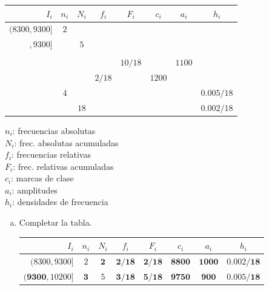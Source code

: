 \documentclass[]{article}
\begin{document}
\begin{enumerate}[{Ejercicio} 1.]
		\begin{minipage}[t]{.7\linewidth}
			\raggedleft
			\vspace*{0pt}
			\begin{center}
				\begin{tabular}{| r | c | c | c | c | c | c | c |}
					\hline
					$I_i$ & $n_i$ & $N_i$ & $f_i$ & $F_i$ & $c_i$ & $a_i$ & $h_i$ \\
					\hline
					$(8300, 9300]$ & $2$ &     & & & & & \\
					$ ,9300]$      &     & $5$ & & & & &  \\
							       &     &     & & & & &  \\
								   &     &     & & $10/18$ & & $1100$&  \\
								   &     &     & $2/18$ & & $1200$ & &  \\
								   & $4$ &     & & & & & $0.005/18$ \\
								   &     &$18$ & & & & &  $0.002/18$ \\
					\hline
				\end{tabular}
			\end{center}
		\end{minipage}%
		\begin{minipage}[t]{.5\linewidth}
			\vspace*{8pt}
			\raggedright
			$n_i$: frecuencias absolutas \\
			$N_i$: frec. absolutas acumuladas \\
			$f_i$: frecuencias relativas \\
			$F_i$: frec. relativas acumuladas \\
			$c_i$: marcas de clase \\
			$a_i$: amplitudes \\
			$h_i$: densidades de frecuencia
		\end{minipage}
		\begin{enumerate}[a)]
			\item Completar la tabla.
				\begin{center}
					\begin{tabular}{| r | c | c | c | c | c | c | c |}
						\hline
						$I_i$ & $n_i$ & $N_i$ & $f_i$ & $F_i$ & $c_i$ & $a_i$ & $h_i$ \\
						\hline
						$(8300, 9300]$ & $2$ & $\mathbf{2}$ & $\mathbf{2/18}$ &$\mathbf{2/18}$ & $\mathbf{8800}$ & $\mathbf{1000}$ & $\mathbf{0.002/18}$\\
						$\mathbf{(9300} ,10200]$ & $\mathbf{3}$ & $5$ & $\mathbf{3/18}$ &$\mathbf{5/18}$ & $\mathbf{9750}$&$\mathbf{900}$ & $\mathbf{0.005/18}$ \\

\end{tabular}
\end{center}
\end{enumerate}
\end{enumerate}
\end{document}
